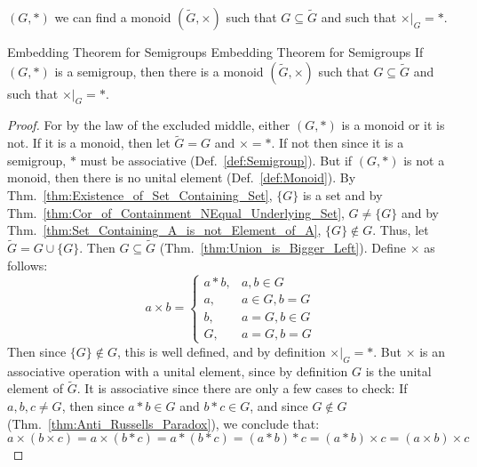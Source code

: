         $(G,*)$ we can find a monoid $(\tilde{G},\times)$ such that
        $G\subseteq\tilde{G}$ and such that $\times|_{G}=*$.
        \begin{ltheorem}{Embedding Theorem for Semigroups}
                        {Embedding Theorem for Semigroups}
            If $(G,*)$ is a semigroup, then there is a monoid
            $(\tilde{G},\times)$ such that $G\subseteq\tilde{G}$ and such that
            $\times|_{G}=*$.
        \end{ltheorem}
        \begin{proof}
            For by the law of the excluded middle, either $(G,*)$ is a monoid or
            it is not. If it is a monoid, then let $\tilde{G}=G$ and $\times=*$.
            If not then since it is a semigroup, $*$ must be associative
            (Def.~\ref{def:Semigroup}). But if $(G,*)$ is not a monoid, then
            there is no unital element (Def.~\ref{def:Monoid}). By
            Thm.~\ref{thm:Existence_of_Set_Containing_Set}, $\{G\}$ is a set and
            by Thm.~\ref{thm:Cor_of_Containment_NEqual_Underlying_Set},
            $G\ne\{G\}$ and by
            Thm.~\ref{thm:Set_Containing_A_is_not_Element_of_A},
            $\{G\}\notin{G}$. Thus, let $\tilde{G}=G\cup\{G\}$. Then
            $G\subseteq\tilde{G}$ (Thm.~\ref{thm:Union_is_Bigger_Left}). Define
            $\times$ as follows:
            \begin{equation}
                a\times{b}=
                \begin{cases}
                    a*b,&a,b\in{G}\\
                    a,&a\in{G},b=G\\
                    b,&a=G,b\in{G}\\
                    G,&a=G,b=G
                \end{cases}
            \end{equation}
            Then since $\{G\}\notin{G}$, this is well defined, and by definition
            $\times|_{G}=*$. But $\times$ is an associative operation with a
            unital element, since by definition $G$ is the unital element of
            $\tilde{G}$. It is associative since there are only a few cases to
            check: If $a,b,c\ne{G}$, then since $a*b\in{G}$ and $b*c\in{G}$, and
            since $G\notin{G}$ (Thm.~\ref{thm:Anti_Russells_Paradox}), we
            conclude that:
            \begin{equation}
                a\times(b\times{c})=a\times(b*c)=a*(b*c)=(a*b)*c=
                (a*b)\times{c}=(a\times{b})\times{c}
            \end{equation}
        \end{proof}

